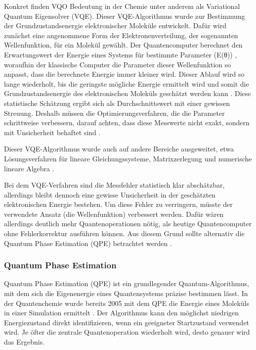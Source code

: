 Konkret finden VQO Bedeutung in der Chemie unter anderem als Variational Quantum Eigensolver (VQE). Dieser VQE-Algorithmus wurde zur Bestimmung der Grundzustandsenergie elektronischer Moleküle entwickelt. Dafür wird zunächst eine angenommene Form der Elektronenverteilung, der sogenannten Wellenfunktion, für ein Molekül gewählt. Der Quantencomputer berechnet den Erwartungswert der Energie eines Systems für bestimmte Parameter (E(θ)) \citealp[23]{mottaEmergingQuantumComputing2022}, woraufhin der klassische Computer die Parameter dieser Wellenfunktion so anpasst, dass die berechnete Energie immer kleiner wird. Dieser Ablauf wird so lange wiederholt, bis die geringste mögliche Energie ermittelt wird und somit die Grundzustandsenergie des elektronischen Moleküls geschätzt werden kann \citealp[6]{weidmanQuantumComputingChemistry2024a}.
Diese statistische Schätzung ergibt sich als Durchschnittswert mit einer gewissen Streuung. Deshalb müssen die Optimierungsverfahren, die die Parameter schrittweise verbessern, darauf achten, dass diese Messwerte nicht exakt, sondern mit Unsicherheit behaftet sind \citealp[23]{mottaEmergingQuantumComputing2022}.

Dieser VQE-Algorithmus wurde auch auf andere Bereiche ausgeweitet, etwa Lösungsverfahren für lineare Gleichungssysteme, Matrixzerlegung und numerische lineare Algebra \citealp[6]{weidmanQuantumComputingChemistry2024a}.

Bei dem VQE-Verfahren sind die Messfehler statistisch klar abschätzbar, allerdings bleibt dennoch eine gewisse Unsicherheit in der geschätzten elektronischen Energie bestehen. Um diese Fehler zu verringern, müsste der verwendete Ansatz (die Wellenfunktion) verbessert werden. Dafür wären allerdings deutlich mehr Quantenoperationen nötig, als heutige Quantencomputer ohne Fehlerkorrektur ausführen können. Aus diesem Grund sollte alternativ die Quantum Phase Estimation (QPE) betrachtet werden \citealp[7]{vonburgQuantumComputingEnhanced2021}.



\subsubsection*{Quantum Phase Estimation}

Quantum Phase Estimation (QPE) ist ein grundlegender Quantum-Algorithmus, mit dem sich die Eigenenergie eines Quantensystems präzise bestimmen lässt. In der Quantenchemie wurde bereits 2005 mit dem QPE die Energie eines Moleküls in einer Simulation ermittelt \citealp[5]{weidmanQuantumComputingChemistry2024a}. Der Algorithmus kann den möglichst niedrigen Energiezustand direkt identifizieren, wenn ein geeigneter Startzustand verwendet wird. Je öfter die zentrale Quantenoperation wiederholt wird, desto genauer wird das Ergebnis.

